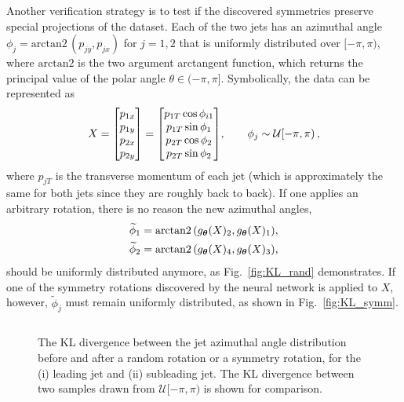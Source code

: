 \documentclass[aps,prx,reprint,preprintnumbers,superscriptaddress,nofootinbib,longbibliography,floatfix]{revtex4-1}
\newcommand{\U}{\mathcal{U}}
\DeclareRobustCommand{\Fig}[1]{Fig.~\ref{fig:#1}}
\begin{document}
Another verification strategy is to test if the discovered symmetries preserve special projections of the dataset.
%
Each of the two jets has an azimuthal angle $\phi_{j} = \text{arctan2}\,(p_{jy}, p_{jx})$ for $j = 1,2$ that is uniformly distributed over $[-\pi, \pi)$, where $\text{arctan2}$ is the two argument arctangent function, which returns the principal value of the polar angle $\theta\in (-\pi, \pi]$.
%
Symbolically, the data can be represented as
%
\begin{equation}
    X = \mqty[p_{1x}\\ p_{1y}\\p_{2x}\\p_{2y}] = \mqty[p_{1T}\cos\phi_{i1}\\p_{1T}\sin\phi_{1}\\p_{2T}\cos\phi_{2}\\p_{2T}\sin\phi_{2}],\qquad \phi_{j}\sim\U[-\pi, \pi)\,,
\end{equation}
%
where $p_{jT}$ is the transverse momentum of each jet (which is approximately the same for both jets since they are roughly back to back).
%
If one applies an arbitrary rotation, there is no reason the new azimuthal angles,
%
\begin{align}
    \widetilde{\phi}_{1} &= \text{arctan2}\,(g_{\vb*\theta}(X)_2, g_{\vb*\theta}(X)_1), \\
    \widetilde{\phi}_{2} &=  \text{arctan2}\,(g_{\vb*\theta}(X)_4, g_{\vb*\theta}(X)_3),
\end{align}
%
should be uniformly distributed anymore, as \Fig{KL_rand} demonstrates.
%
If one of the symmetry rotations discovered by the neural network is applied to $X$, however, $\widetilde{\phi}_{j}$ must remain uniformly distributed, as shown in \Fig{KL_symm}.


\begin{figure*}[t]
    \centering
    $\quad$
    \caption{
    The KL divergence between the jet azimuthal angle distribution before and after a random rotation or a symmetry rotation, for the (i) leading jet and (ii) subleading jet.
    The KL divergence between two samples drawn from $\mathcal U[-\pi, \pi)$ is shown for comparison.
    }
    \label{fig:KL_div}
\end{figure*}
\end{document}
